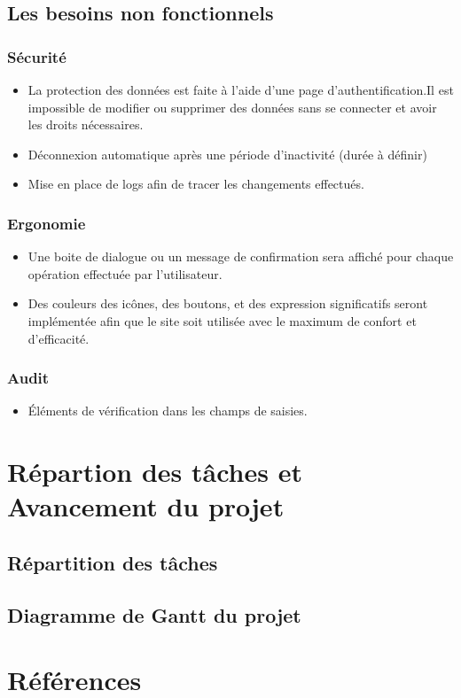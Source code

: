 \documentclass{article}
\begin{document}
\subsection{Les besoins non fonctionnels}

\subsubsection{Sécurité}
\begin{itemize}
 \item La protection des données est faite à l'aide d'une page d'authentification.Il est impossible de modifier ou supprimer des données sans se connecter et avoir les droits nécessaires. 
 \item Déconnexion automatique après une période d'inactivité (durée à définir)
 \item Mise en place de logs afin de tracer les changements effectués.
\end{itemize}
\subsubsection{Ergonomie}
\begin{itemize}
\item Une boite de dialogue ou un message de confirmation sera affiché pour chaque opération effectuée par l'utilisateur.
\item Des couleurs des icônes, des boutons, et des expression significatifs seront implémentée afin que le site soit utilisée avec le maximum de confort et d'efficacité.
\end{itemize}
\subsubsection{Audit}
\begin{itemize}
\item Éléments de vérification dans les champs de saisies.
\end{itemize}

\section{Répartion des tâches et Avancement du projet}

\subsection{Répartition des tâches}
\subsection{Diagramme de Gantt du projet}

\section{Références}
\end{document}
